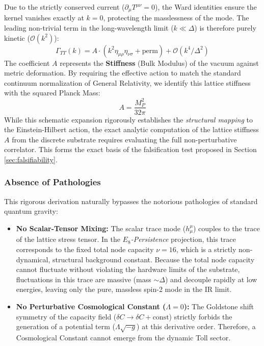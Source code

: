 Due to the strictly conserved current ($\partial_\mu T^{\mu\nu} = 0$), the Ward identities ensure the kernel vanishes exactly at $k=0$, protecting the masslessness of the mode. The leading non-trivial term in the long-wavelength limit ($k \ll \Delta$) is therefore purely kinetic ($\mathcal{O}(k^2)$):
\begin{equation}
\Gamma_{TT}(k) = A \cdot (k^2 \eta_{\mu\rho} \eta_{\nu\sigma} + \text{perm}) + \mathcal{O}(k^4/\Delta^2)
\end{equation}
The coefficient $A$ represents the \textbf{Stiffness} (Bulk Modulus) of the vacuum against metric deformation. By requiring the effective action to match the standard continuum normalization of General Relativity, we identify this lattice stiffness with the squared Planck Mass:
\begin{equation}
A = \frac{M_P^2}{32\pi}
\end{equation}
While this schematic expansion rigorously establishes the \textit{structural mapping} to the Einstein-Hilbert action, the exact analytic computation of the lattice stiffness $A$ from the discrete substrate requires evaluating the full non-perturbative correlator. This forms the exact basis of the falsification test proposed in Section \ref{sec:falsifiability}.

\subsubsection{Absence of Pathologies}
This rigorous derivation naturally bypasses the notorious pathologies of standard quantum gravity:
\begin{itemize}
    \item \textbf{No Scalar-Tensor Mixing:} The scalar trace mode ($h^\mu_\mu$) couples to the trace of the lattice stress tensor. In the \textit{$E_8$-Persistence} projection, this trace corresponds to the fixed total node capacity $\nu=16$, which is a strictly non-dynamical, structural background constant. Because the total node capacity cannot fluctuate without violating the hardware limits of the substrate, fluctuations in this trace are massive (mass $\sim \Delta$) and decouple rapidly at low energies, leaving only the pure, massless spin-2 mode in the IR limit.
    \item \textbf{No Perturbative Cosmological Constant ($\Lambda=0$):} The Goldstone shift symmetry of the capacity field ($\delta C \to \delta C + \text{const}$) strictly forbids the generation of a potential term ($\Lambda \sqrt{-g}$) at this derivative order. Therefore, a Cosmological Constant cannot emerge from the dynamic Toll sector.
\end{itemize}

